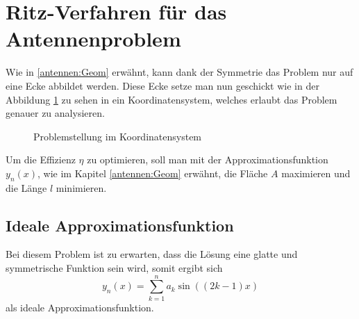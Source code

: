 %
%
% 
%
%

\usetikzlibrary{pgfplots.fillbetween}

\section{Ritz-Verfahren für das Antennenproblem\label{antennen:ritzAnw}}

Wie in \ref{antennen:Geom} erwähnt, kann dank der Symmetrie das Problem nur auf eine Ecke abbildet werden. 
Diese Ecke setze man nun geschickt wie in der Abbildung \ref{antennen:koordSysBsp} zu sehen 
in ein Koordinatensystem, welches erlaubt das Problem genauer zu analysieren.
\begin{figure}
	\centering
	\caption{Problemstellung im Koordinatensystem}
	\label{antennen:koordSysBsp}
\end{figure}

Um die Effizienz $\eta$ zu optimieren, soll man mit der Approximationsfunktion
$y_n(x)$, wie im Kapitel \ref{antennen:Geom} erwähnt, die Fläche $A$ 
maximieren und die Länge $l$ minimieren.

\subsection{Ideale Approximationsfunktion\label{antennen:unsereApproxFunkt}}

Bei diesem Problem ist zu erwarten, dass die Lösung eine glatte und symmetrische
Funktion sein wird, somit ergibt sich
\begin{equation}
	y_n(x)
	= 
	\sum_{k=1}^n a_k\sin((2k-1)x)
	\label{antennen:unserRitz}
\end{equation}
als ideale Approximationsfunktion. 

